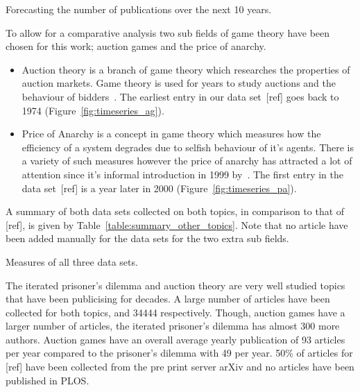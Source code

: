 \documentclass{article}
\theoremstyle{definition}
\newcommand{\totalarticles}{}
\begin{document}
\begin{table}[!hbtp]
    \begin{center}
    
    \end{center}
    \caption{Forecasting the number of publications over the next 10 years.}
    \label{table:forecast}
\end{table}

To allow for a comparative analysis two sub fields of game theory have been chosen
for this work; auction games and the price of anarchy.

\begin{itemize}
    \item Auction theory is a branch of game theory which researches the properties
    of auction markets.
    Game theory is used for years to study auctions and the behaviour of
    bidders~\cite{Shubik1971}. The earliest entry in our data set~[ref] goes
    back to 1974 (Figure~\ref{fig:timeseries_ag}).
    \item Price of Anarchy is a concept in game theory which
    measures how the efficiency of a system degrades due to selfish behaviour of
    it's agents. There is a variety of such measures however the price of anarchy
    has attracted a lot of attention since it's informal introduction in 1999
    by~\cite{Koutsoupias1999}. The first entry in the data set~[ref] is a year
    later in 2000 (Figure~\ref{fig:timeseries_pa}).
\end{itemize}

A summary of both data sets collected on both topics, in comparison to that of
[ref], is given by Table~\ref{table:summary_other_topics}. Note that no article
have been added manually for the data sets for the two extra sub fields.

\begin{table}[!hbtp]
    \centering
    \resizebox{\textwidth}{!}{
    }
    \caption{Measures of all three data sets.}\label{table:summary_other_topics}
\end{table}

The iterated prisoner's dilemma and auction theory are very well studied topics
that have been publicising for decades. A large number of articles have
been collected for both topics, \totalarticles and 34444 respectively. Though, auction
games have a larger number of articles, the iterated prisoner's dilemma
has almost 300 more authors. Auction games have an overall average yearly publication
of 93 articles per year compared to the prisoner's dilemma with 49 per year. 50\% of articles
for [ref] have been collected from the pre print server arXiv and no articles have
been published in PLOS.
\end{document}
